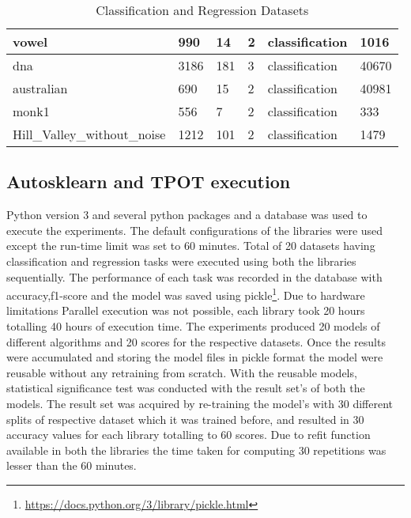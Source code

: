 \begin{table}[]
\begin{tabular}{|l|l|l|l|l|l|}
vowel                           & 990       & 14       & 2       & classification & 1016       \\ \hline
dna                             & 3186      & 181      & 3       & classification & 40670      \\ \hline
australian                      & 690       & 15       & 2       & classification & 40981      \\ \hline
monk1                           & 556       & 7        & 2       & classification & 333        \\ \hline
Hill\_Valley\_without\_noise    & 1212      & 101      & 2       & classification & 1479       \\ \hline
\end{tabular}
\caption{Classification and Regression Datasets}
\end{table}

\subsection{Autosklearn and TPOT execution}
Python version 3 and several python packages and a database was used to execute the experiments. The default configurations of the libraries were used except the run-time limit was set to 60 minutes. Total of 20 datasets having classification and regression tasks were executed using both the libraries sequentially. The performance of each task was recorded in the database with accuracy,f1-score and the model was saved using pickle\footnote{\url{https://docs.python.org/3/library/pickle.html}}. Due to hardware limitations Parallel execution was not possible, each library took 20 hours totalling 40 hours of execution time. The experiments produced 20 models of different algorithms and 20 scores for the respective datasets. Once the results were accumulated and storing the model files in pickle format the model were reusable without any retraining from scratch. With the reusable models, statistical significance test was conducted with the result set's of both the models. The result set was acquired by re-training the model's with 30 different splits of respective dataset which it was trained before, and resulted in 30 accuracy values for each library totalling to 60 scores. Due to refit function available in both the libraries the time taken for computing 30 repetitions was lesser than the 60 minutes.

